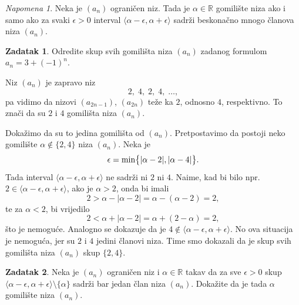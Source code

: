 \documentclass{book}
\let\originalleft\left
\let\originalright\right
\renewcommand{\left}{\mathopen{}\mathclose\bgroup\originalleft}
\renewcommand{\right}{\aftergroup\egroup\originalright}
\renewenvironment{proof}{%
    \vspace{-\parskip}\begin{oldproof}%
    }{%
    \end{oldproof}%
}
\theoremstyle{definition}
\theoremstyle{definition}
\newtheorem{exercise}{Zadatak}
\theoremstyle{remark}
\newtheorem{remark}{Napomena}
\begin{document}
\begin{remark} Neka je $(a_n)$ ograničen niz. Tada je $\alpha\in \mathbb{R}$ gomilište niza ako i samo ako za svaki $\epsilon>0$ interval $\langle \alpha-\epsilon, \alpha+\epsilon\rangle$ sadrži beskonačno mnogo članova niza $(a_n)$.
\end{remark}

\begin{exercise}
\label{limitpoints1}
Odredite skup svih gomilišta niza $(a_n)$ zadanog formulom $a_n=3+(-1)^n$.
\end{exercise}
\begin{proof}[Rješenje]
Niz $(a_n)$ je zapravo niz $$2,\; 4, \; 2,\; 4,\;\dots,$$ pa vidimo da nizovi $(a_{2n-1})$, $(a_{2n})$ teže ka $2$, odnosno $4$, respektivno. To znači da su $2$ i $4$ gomilišta niza $(a_n)$. 

Dokažimo da su to jedina gomilišta od $(a_n)$. Pretpostavimo da postoji neko gomilište $\alpha\notin \{2, 4\}$ niza $(a_n)$. Neka je $$\epsilon=\min\left\{|\alpha-2|,|\alpha-4|\right\}.$$ Tada interval $\langle\alpha-\epsilon, \alpha+\epsilon\rangle$ ne sadrži ni $2$ ni $4$. Naime, kad bi bilo npr. $2\in \langle\alpha-\epsilon, \alpha+\epsilon\rangle$, ako je $\alpha>2$, onda bi imali $$2>\alpha-|\alpha-2|=\alpha-(\alpha-2)=2,$$ te za $\alpha<2$, bi vrijedilo $$2<\alpha+|\alpha-2|=\alpha+(2-\alpha)=2,$$ 
što je nemoguće. Analogno se dokazuje da je $4\notin\langle\alpha-\epsilon, \alpha+\epsilon\rangle$. 
No ova situacija je nemoguća, jer su $2$ i $4$ jedini članovi niza. Time smo dokazali da je skup svih gomilišta niza $(a_n)$ skup $\{2, 4\}$.
\end{proof}
\begin{exercise}
\label{limitpoints3}
Neka je $(a_n)$ ograničen niz i $\alpha\in \mathbb{R}$ takav da za sve $\epsilon>0$ skup $\langle \alpha-\epsilon, \alpha+\epsilon\rangle\setminus \{\alpha\}$ sadrži bar jedan član niza $(a_n)$. Dokažite da je tada $\alpha$ gomilište niza $(a_n)$.
\end{exercise}
\end{document}
